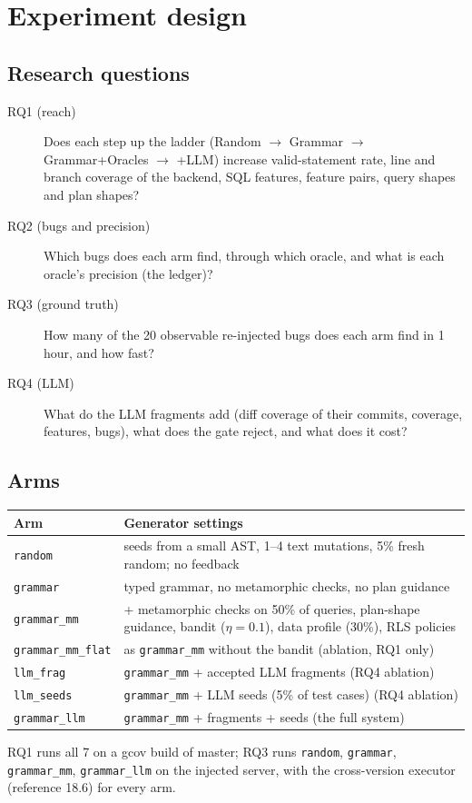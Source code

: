 \section{Experiment design}
\label{sec:design}

\subsection{Research questions}

\begin{description}
  \item[RQ1 (reach)] Does each step up the ladder (Random $\rightarrow$
    Grammar $\rightarrow$ Grammar+Oracles $\rightarrow$ +LLM) increase
    valid-statement rate, line and branch coverage of the backend, SQL
    features, feature pairs, query shapes and plan shapes?
  \item[RQ2 (bugs and precision)] Which bugs does each arm find, through which
    oracle, and what is each oracle's precision (the ledger)?
  \item[RQ3 (ground truth)] How many of the 20 observable re-injected bugs
    does each arm find in 1 hour, and how fast?
  \item[RQ4 (LLM)] What do the LLM fragments add (diff coverage of their
    commits, coverage, features, bugs), what does the gate reject, and what
    does it cost?
\end{description}

\subsection{Arms}

\begin{center}
\small
\begin{tabularx}{\linewidth}{lX}
\toprule
Arm & Generator settings \\
\midrule
\texttt{random} & seeds from a small AST, 1--4 text mutations, 5\% fresh random; no feedback \\
\texttt{grammar} & typed grammar, no metamorphic checks, no plan guidance \\
\texttt{grammar\_mm} & + metamorphic checks on 50\% of queries, plan-shape guidance, bandit ($\eta=0.1$), data profile (30\%), RLS policies \\
\texttt{grammar\_mm\_flat} & as \texttt{grammar\_mm} without the bandit (ablation, RQ1 only) \\
\texttt{llm\_frag} & \texttt{grammar\_mm} + accepted LLM fragments (RQ4 ablation) \\
\texttt{llm\_seeds} & \texttt{grammar\_mm} + LLM seeds (5\% of test cases) (RQ4 ablation) \\
\texttt{grammar\_llm} & \texttt{grammar\_mm} + fragments + seeds (the full system) \\
\bottomrule
\end{tabularx}
\end{center}
RQ1 runs all 7 on a gcov build of master; RQ3 runs \texttt{random},
\texttt{grammar}, \texttt{grammar\_mm}, \texttt{grammar\_llm} on the injected
server, with the cross-version executor (reference 18.6) for every arm.

